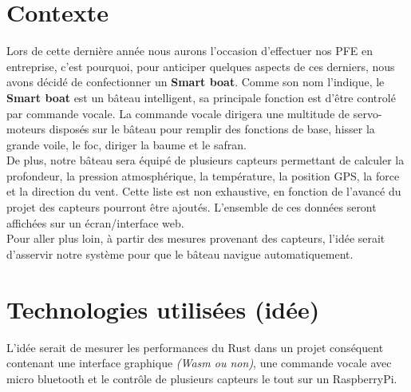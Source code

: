 \section{Contexte}

Lors de cette dernière année nous aurons l'occasion d'effectuer nos PFE en entreprise, c'est pourquoi, pour anticiper quelques aspects de ces derniers, nous avons décidé de confectionner un \textbf{Smart boat}. Comme son nom l'indique, le \textbf{Smart boat} est un bâteau intelligent, sa principale fonction est d'être controlé par commande vocale.
La commande vocale dirigera une multitude de servo-moteurs disposés sur le bâteau pour remplir des fonctions de base, hisser la grande voile, le foc, diriger la baume et le safran. \\

De plus, notre bâteau sera équipé de plusieurs capteurs permettant de calculer la profondeur, la pression atmosphérique, la température, la position GPS, la force et la direction du vent. Cette liste est non exhaustive, en fonction de l'avancé du projet des capteurs pourront être ajoutés. L'ensemble de ces données seront affichées sur un écran/interface web.\\

Pour aller plus loin, à partir des mesures provenant des capteurs, l'idée serait d'asservir notre système pour que le bâteau navigue automatiquement.

\section{Technologies utilisées (idée)}

L'idée serait de mesurer les performances du Rust dans un projet conséquent contenant une interface graphique \textit{(Wasm ou non)}, une commande vocale avec micro bluetooth et le contrôle de plusieurs capteurs le tout sur un RaspberryPi.
\vspace{.3cm}

